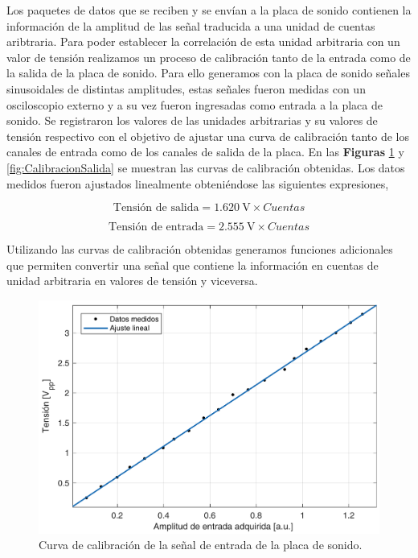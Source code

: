 \documentclass[a4paper,11pt]{article}
\begin{document}
Los paquetes de datos que se reciben y se envían a la placa de sonido
contienen la información de la amplitud de las señal traducida a una
unidad de cuentas aribtraria. Para poder establecer la correlación de
esta unidad arbitraria con un valor de tensión realizamos un proceso de
calibración tanto de la entrada como de la salida de la placa de sonido.
Para ello generamos con la placa de sonido señales sinusoidales de
distintas amplitudes, estas señales fueron medidas con un osciloscopio
externo y a su vez fueron ingresadas como entrada a la placa de sonido.
Se registraron los valores de las unidades arbitrarias y su valores de
tensión respectivo con el objetivo de ajustar una curva de calibración
tanto de los canales de entrada como de los canales de salida de la
placa.  En las \textbf{Figuras} \ref{fig:CalibracionEntrada} y
\ref{fig:CalibracionSalida} se muestran las curvas de calibración
obtenidas.  Los datos medidos fueron ajustados linealmente obteniéndose
las siguientes expresiones,
	
\begin{equation*}
	 \text{Tensión de salida} = \SI{1.620}{\V} \times Cuentas%
\end{equation*}

\begin{equation*}
	\text{Tensión de entrada} = \SI{2.555}{\V} \times Cuentas%
\end{equation*}

Utilizando las curvas de calibración obtenidas generamos funciones
adicionales que permiten convertir una señal que contiene la información
en cuentas de unidad arbitraria en valores de tensión y viceversa.

	\begin{figure}[!h]
		\centering
		\includegraphics[width=\textwidth]{imagenes/CalibracionEntrada.pdf}
		\caption{Curva de calibración de la señal de entrada de la placa
de sonido.}
        \label{fig:CalibracionEntrada}
	\end{figure}
	
\end{document}
